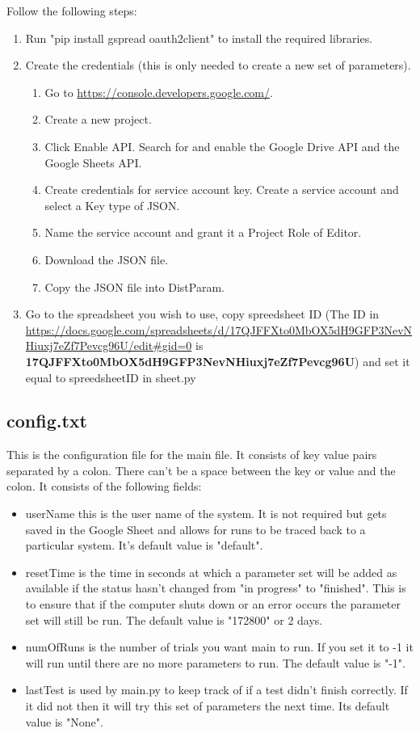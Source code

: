 \documentclass[12pt]{article}
\begin{document}
Follow the following steps:\\
\begin{enumerate}
	\item Run "pip install gspread oauth2client" to install the required libraries.\\
	\item Create the credentials (this is only needed to create a new set of parameters).
	\begin{enumerate}
		\item Go to \href{https://console.developers.google.com/}{https://console.developers.google.com/}.
		\item Create a new project.
		\item Click Enable API. Search for and enable the Google Drive API and the Google Sheets API.
		\item Create credentials for service account key.  Create a service account and select a Key type of JSON.  
		\item Name the service account and grant it a Project Role of Editor.
		\item Download the JSON file.
		\item Copy the JSON file into DistParam.
	\end{enumerate}
	\item Go to the spreadsheet you wish to use, copy spreedsheet ID (The ID in  \url{https://docs.google.com/spreadsheets/d/17QJFFXto0MbOX5dH9GFP3NevNHiuxj7eZf7Pevcg96U/edit#gid=0} is \textbf{17QJFFXto0MbOX5dH9GFP3NevNHiuxj7eZf7Pevcg96U}) and set it equal to spreedsheetID in sheet.py
\end{enumerate}


\subsection{config.txt}
This is the configuration file for the main file.  It consists of key value pairs separated by a colon.  There can't be a space between the key or value and the colon.  It consists of the following fields:
\begin{itemize}
	\item userName this is the user name of the system.  It is not required but gets saved in the Google Sheet and allows for runs to be traced back to a particular system.  It's default value is "default".
	\item resetTime is the time in seconds at which a parameter set will be added as available if the status hasn't changed from "in progress" to "finished".  This is to ensure that if the computer shuts down or an error occurs the parameter set will still be run.  The default value is "172800" or 2 days.
	\item numOfRuns is the number of trials you want main to run.  If you set it to -1 it will run until there are no more parameters to run.  The default value is "-1".
	\item lastTest is used by main.py to keep track of if a test didn't finish correctly.  If it did not then it will try this set of parameters the next time.  Its default value is "None".
\end{itemize}
\end{document}
